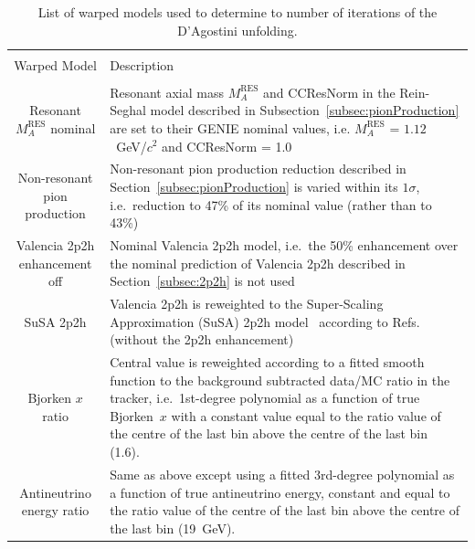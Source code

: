 \begin{table}[b!]
    \centering

    \begin{tabular}{c p{10cm}}
    \hline\\ [-1.5 ex]
    Warped Model & Description \\ [0.5ex] %
    \hline\hline\\[-1.7ex]
    Resonant $M_{A}^{\text{RES}}$ nominal & Resonant axial mass $M_{A}^{\text{RES}}$ and CCResNorm in the Rein-Seghal model described in Subsection~\ref{subsec:pionProduction} are set to their GENIE nominal values, i.e. $M_{A}^{\text{RES}}$ = $1.12$~GeV/$c^2$  and CCResNorm = 1.0 \\ %
    \hline
    Non-resonant pion production & Non-resonant pion production reduction described in Section~\ref{subsec:pionProduction} is varied within its $1\sigma$, i.e.~reduction to 47\% of its nominal value (rather than to 43\%) \\
    \hline
    Valencia 2p2h enhancement off & Nominal Valencia 2p2h model, i.e.~the 50\% enhancement over the nominal prediction of Valencia 2p2h described in Section~\ref{subsec:2p2h} is not used \\ %
    \hline
    SuSA 2p2h & Valencia 2p2h is reweighted to the Super-Scaling Approximation (SuSA) 2p2h model~\cite{PhysRevD.94.093004} according to Refs.~\cite{PhysRevD.101.033003,SuSAreweight_MINERvA} (without the 2p2h enhancement)\\%
    \hline
    Bjorken $x$ ratio & Central value is reweighted according to a fitted smooth function to the background subtracted data/MC ratio in the tracker, i.e.~1st-degree polynomial as a function of true Bjorken~$x$ with a constant value equal to the ratio value of the centre of the last bin above the centre of the last bin (1.6).
     \\ %
    \hline
    Antineutrino energy ratio & Same as above except using a fitted 3rd-degree polynomial as a function of true antineutrino energy, constant and equal to the ratio value of the centre of the last bin above the centre of the last bin (19~GeV). \\ %
    \hline
    \end{tabular}

    \caption{List of warped models used to determine to number of iterations of the D'Agostini unfolding.}
    \label{table:warpingList}
\end{table}

